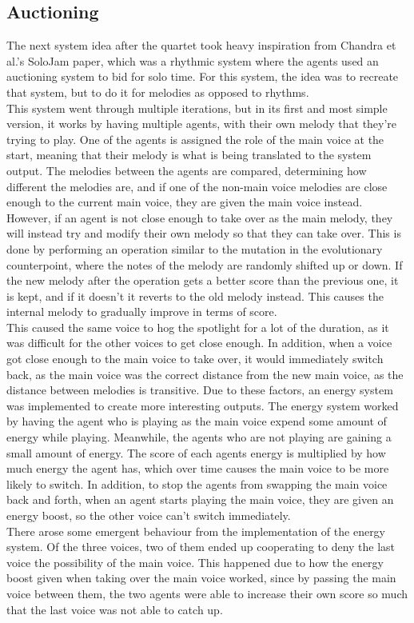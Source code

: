 \documentclass[a4paper,english]{report}
\begin{document}
	\subsection{Auctioning}
	The next system idea after the quartet took heavy inspiration from Chandra et al.'s SoloJam paper, which was a rhythmic system where the agents used an auctioning system to bid for solo time. For this system, the idea was to recreate that system, but to do it for melodies as opposed to rhythms.\\
	This system went through multiple iterations, but in its first and most simple version, it works by having multiple agents, with their own melody that they're trying to play. One of the agents is assigned the role of the main voice at the start, meaning that their melody is what is being translated to the system output. The melodies between the agents are compared, determining how different the melodies are, and if one of the non-main voice melodies are close enough to the current main voice, they are given the main voice instead. However, if an agent is not close enough to take over as the main melody, they will instead try and modify their own melody so that they can take over. This is done by performing an operation similar to the mutation in the evolutionary counterpoint, where the notes of the melody are randomly shifted up or down. If the new melody after the operation gets a better score than the previous one, it is kept, and if it doesn't it reverts to the old melody instead. This causes the internal melody to gradually improve in terms of score.\\
	This caused the same voice to hog the spotlight for a lot of the duration, as it was difficult for the other voices to get close enough. In addition, when a voice got close enough to the main voice to take over, it would immediately switch back, as the main voice was the correct distance from the new main voice, as the distance between melodies is transitive. Due to these factors, an energy system was implemented to create more interesting outputs. The energy system worked by having the agent who is playing as the main voice expend some amount of energy while playing. Meanwhile, the agents who are not playing are gaining a small amount of energy. The score of each agents energy is multiplied by how much energy the agent has, which over time causes the main voice to be more likely to switch. In addition, to stop the agents from swapping the main voice back and forth, when an agent starts playing the main voice, they are given an energy boost, so the other voice can't switch immediately.\\
	There arose some emergent behaviour from the implementation of the energy system. Of the three voices, two of them ended up cooperating to deny the last voice the possibility of the main voice. This happened due to how the energy boost given when taking over the main voice worked, since by passing the main voice between them, the two agents were able to increase their own score so much that the last voice was not able to catch up.
	
\end{document}
